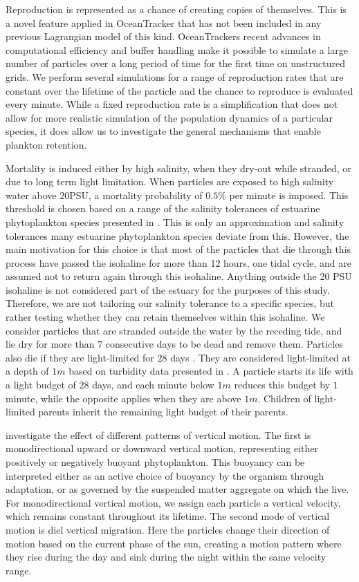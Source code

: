 \documentclass[npg, manuscript]{copernicus}
\begin{document}
Reproduction is represented as a chance of creating copies of themselves.
This is a novel feature applied in OceanTracker that has not been included in any previous Lagrangian model of this kind.
OceanTrackers recent advances in computational efficiency \citep{Vennell2021} and buffer handling make it possible to simulate a large number of particles over a long period of time for the first time on unstructured grids.
We perform several simulations for a range of reproduction rates that are constant over the lifetime of the particle and the chance to reproduce is evaluated every minute.
While a fixed reproduction rate is a simplification that does not allow for more realistic simulation of the population dynamics of a particular species, it does allow us to investigate the general mechanisms that enable plankton retention.

Mortality is induced either by high salinity, when they dry-out while stranded, or due to long term light limitation.
When particles are exposed to high salinity water above $20$PSU, a mortality probability of $0.5\%$ per minute is imposed.
This threshold is chosen based on a range of the salinity tolerances of estuarine phytoplankton species presented in \citep{vonAlvensleben2016}.
This is only an approximation and salinity tolerances many estuarine phytoplankton species deviate from this.
However, the main motivation for this choice is that most of the particles that die through this process have passed the isohaline for more than 12 hours, one tidal cycle, and are assumed not to return again through this isohaline.
Anything outside the 20 PSU isohaline is not considered part of the estuary for the purposes of this study.
Therefore, we are not tailoring our salinity tolerance to a specific species, but rather testing whether they can retain themselves within this isohaline.
We consider particles that are stranded outside the water by the receding tide, and lie dry for more than $7$ consecutive days to be dead and remove them.
Particles also die if they are light-limited for $28$ days \citep{Walter2017}.
They are considered light-limited at a depth of $1 \unit{m}$ based on turbidity data presented in \citep{Pein2021}.
A particle starts its life with a light budget of $28$ days, and each minute below $1 \unit{m}$ reduces this budget by $1$ minute, while the opposite applies when they are above $1 \unit{m}$.
Children of light-limited parents inherit the remaining light budget of their parents.

\medskip

investigate the effect of different patterns of vertical motion.
The first is monodirectional upward or downward vertical motion, representing either positively or negatively buoyant phytoplankton.
This buoyancy can be interpreted either as an active choice of buoyancy by the organism through adaptation, or as governed by the suspended matter aggregate on which the live.
For monodirectional vertical motion, we assign each particle a vertical velocity, which remains constant throughout its lifetime.
The second mode of vertical motion is diel vertical migration.
Here the particles change their direction of motion based on the current phase of the sun, creating a motion pattern where they rise during the day and sink during the night within the same velocity range.
\end{document}
